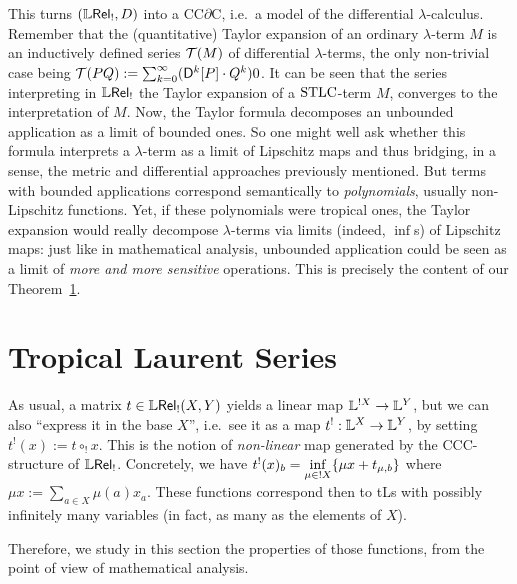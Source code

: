 \documentclass[submission,%
]{eptcs}
\begin{document}
This turns $(\mathbb{L} \mathsf{Rel}_!,D)$ into a CC$\partial$C, i.e.\ a model of the differential $\lambda$-calculus.
Remember that the (quantitative) Taylor expansion of an ordinary $\lambda$-term $M$ is an inductively defined series $\mathcal{T}(M)$ of differential $\lambda$-terms, the only non-trivial case being $\mathcal{T}(PQ) :=  \sum_{k=0}^{\infty} (\mathsf{D}^{k}[P] \cdot Q^{k})0$.
It can be seen that the series interpreting in $\mathbb{L} \mathsf{Rel}_!$ the Taylor expansion of a $\mathrm{STLC}$-term $M$, converges to the interpretation of $M$.
Now, the Taylor formula decomposes an unbounded application as a limit of bounded ones.
So one might well ask whether this formula interprets a $\lambda$-term 
as a limit of Lipschitz maps and thus bridging, in a sense, the metric and differential approaches previously mentioned.  
But terms with bounded applications correspond semantically to \emph{polynomials}, usually non-Lipschitz functions. 
Yet, if these polynomials were tropical ones, the Taylor expansion would really decompose $\lambda$-terms via limits (indeed, $\inf$s) of Lipschitz maps: just like in mathematical analysis, unbounded application could be seen 
as a limit of \emph{more and more sensitive} operations.
This is precisely the content of our Theorem~\ref{}.

\section{Tropical Laurent Series}

 As usual, a matrix $t\in{\mathbb{L}\mathsf{Rel}_!}(X,Y)$ yields a linear map $\mathbb{L}^{!X}\to\mathbb{L}^Y$, but we can also ``express it in the base $X$'', i.e.\ see it as a map $t^!:\mathbb{L}^X\to\mathbb{L}^Y$, by setting 
 $t^!(x):=t\circ_! x$.
 This is the notion of \emph{non-linear} map generated by the CCC-structure of $\mathbb{L} \mathsf{Rel}_!$.
 Concretely, we have $t^!(x)_b=\inf\limits_{\mu\in !X} \{\mu x+ t_{\mu,b}\}$
 where $\mu x:=\sum\limits_{a\in X} \mu(a)x_a$.
 These functions correspond then to tLs with possibly infinitely many variables (in fact, as many as the elements of $X$). 

Therefore, we study in this section the properties of those functions, from the point of view of mathematical analysis.
 
% 
%
\end{document}
